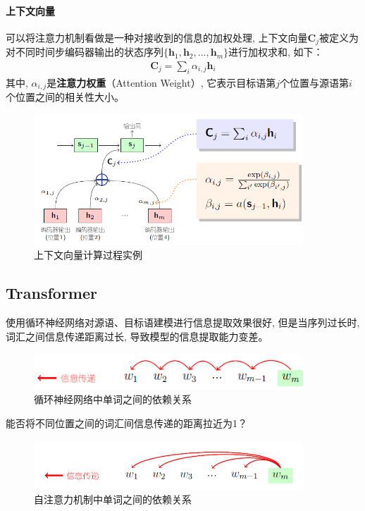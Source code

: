 \documentclass[a4paper]{article}
\begin{document}
    \paragraph{上下文向量}
可以将注意力机制看做是一种对接收到的信息的加权处理, 上下文向量$\mathbf{C}_j$被定义为对不同时间步编码器输出的状态序列$\{ \mathbf{h}_1,  \mathbf{h}_2, ..., \mathbf{h}_m \}$进行加权求和, 如下：
    \begin{eqnarray}
    \mathbf{C}_j=\sum_{i} \alpha_{i, j} \mathbf{h}_i
    \end{eqnarray}
其中, $\alpha_{i, j}$是{\small\sffamily\bfseries{注意力权重}}（Attention Weight）, 它表示目标语第$j$个位置与源语第$i$个位置之间的相关性大小。

\begin{figure}[htp]
    \centering
\includegraphics[width=0.9\textwidth]{context_vector_cacl.png}
    \caption{上下文向量计算过程实例}
    \end{figure}

\subsection{Transformer}
使用循环神经网络对源语、目标语建模进行信息提取效果很好, 但是当序列过长时, 词汇之间信息传递距离过长, 导致模型的信息提取能力变差。
\begin{figure}[htp]
    \centering
    \includegraphics[width=0.9\textwidth]{self-attention1.png}
    \caption{循环神经网络中单词之间的依赖关系}
    \end{figure}
 能否将不同位置之间的词汇间信息传递的距离拉近为1？ 
 \begin{figure}[htp]
    \centering
    \includegraphics[width=0.9\textwidth]{self_attention2.png}
    \caption{自注意力机制中单词之间的依赖关系}
    \end{figure}
\end{document}
